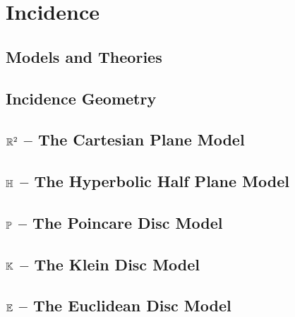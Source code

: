 \documentclass{memoir}
\begin{document}
\mainmatter

\chapter{Incidence}
\newpage

  \section{Models and Theories}
    
    \newpage

  \section{Incidence Geometry}
    
    \newpage

  \section{\(\mathbb{R}^2\) -- The Cartesian Plane Model}
    
    \newpage

  \section{\(\mathbb{H}\) -- The Hyperbolic Half Plane Model}
    
    \newpage

  \section{\(\mathbb{P}\) -- The Poincare Disc Model}
    
    \newpage

  \section{\(\mathbb{K}\) -- The Klein Disc Model}
    
    \newpage

  \section{\(\mathbb{E}\) -- The Euclidean Disc Model}
    \newpage

\end{document}

